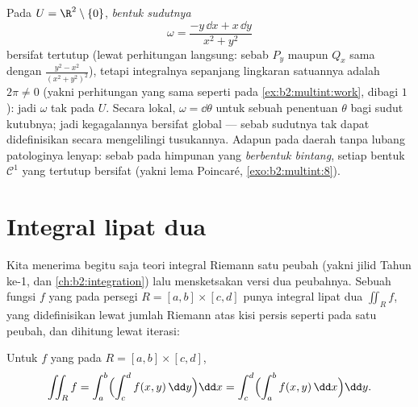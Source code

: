 \begin{example}\label{ex:b2:multint:angleform}
Pada $U = \R^2 \setminus \{0\}$, \emph{bentuk sudutnya}
\[
\omega = \frac{-y\,\dd x + x\,\dd y}{x^2 + y^2}
\]
bersifat tertutup (lewat perhitungan langsung: sebab $P_y$ maupun $Q_x$ sama dengan
$\frac{y^2 - x^2}{(x^2+y^2)^2}$), tetapi integralnya sepanjang lingkaran
satuannya adalah $2\pi \neq 0$ (yakni perhitungan yang sama seperti pada
\cref{ex:b2:multint:work}, dibagi $1$): jadi $\omega$ tak 
pada $U$. Secara lokal, $\omega = \dd\theta$ untuk sebuah penentuan
$\theta$ bagi sudut kutubnya; jadi kegagalannya bersifat global --- sebab sudutnya
tak dapat didefinisikan secara  mengelilingi tusukannya. Adapun pada daerah
tanpa lubang patologinya lenyap: sebab pada himpunan  yang \emph{berbentuk
bintang}, setiap bentuk $\mathcal{C}^1$ yang tertutup bersifat 
(yakni lema Poincaré, \cref{exo:b2:multint:8}).
\end{example}

\section{Integral lipat dua}

Kita menerima begitu saja teori integral Riemann satu
peubah (yakni jilid Tahun ke-1, dan \cref{ch:b2:integration}) lalu mensketsakan
versi dua peubahnya. Sebuah fungsi $f$ yang  pada persegi 
$R = [a, b] \times [c, d]$ punya integral lipat dua $\iint_R f$, yang
didefinisikan lewat jumlah Riemann atas kisi persis seperti pada satu peubah, dan
dihitung lewat iterasi:

\begin{theorem}\label{thm:b2:multint:fubini}
Untuk $f$ yang  pada $R = [a,b] \times [c,d]$,
\[
\iint_R f
= \int_a^b \Bigl(\int_c^d f(x, y)\,\dd y\Bigr)\dd x
= \int_c^d \Bigl(\int_a^b f(x, y)\,\dd x\Bigr)\dd y .
\]
\end{theorem}

